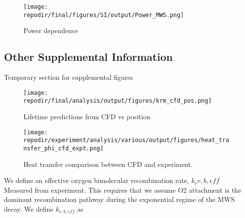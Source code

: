 \begin{figure}[h]
    \texttt{[image: \\repodir/final/figures/SI/output/Power\_MWS.png]} 
    \caption{Power dependence}
    \label{fig:SI_power_dependence}
\end{figure}


\clearpage

\subsection{Other Supplemental Information}

Temporary section for supplemental figures


\begin{figure}[h]
    \texttt{[image: \\repodir/final/analysis/output/figures/krm\_cfd\_pos.png]} 
    \caption{Lifetime predictions from CFD vs position}
    \label{fig:SI_krm_cfd_pos.png}
\end{figure}



\begin{figure}[]
\centering
\texttt{[image: \\repodir/experiment/analysis/various/output/figures/heat\_transfer\_phi\_cfd\_expt.png]}
\caption{Heat transfer comparison between CFD and experiment.}
\label{fig:SI_heat_transfer_phi_cfd_expt}
\end{figure}


\clearpage

We define an effective oxygen bimolecular recombination rate, $k_r{r, b,eff}$ Measured from experiment. This requires that we assume O2 attachment is the dominant recombination pathway during the exponential regime of the MWS decay. We define $k_{r,b,eff}$ as 

